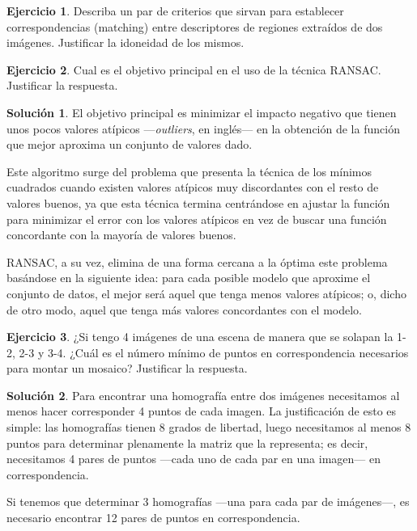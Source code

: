 \documentclass[a4paper, 11pt]{article}
\theoremstyle{definition}
\newtheorem{ejercicio}{Ejercicio}
\newtheorem*{solucion}{Solución}
\theoremstyle{theorem}
\begin{document}
  \begin{ejercicio}
      Describa un par de criterios que sirvan para establecer correspondencias (matching) entre descriptores de regiones extraídos de dos imágenes. Justificar la idoneidad de los mismos.
  \end{ejercicio}

  \begin{ejercicio}
      Cual es el objetivo principal en el uso de la técnica RANSAC. Justificar la respuesta.
  \end{ejercicio}

  \begin{solucion}
      El objetivo principal es minimizar el impacto negativo que tienen unos pocos valores atípicos ---\emph{outliers}, en inglés--- en la obtención de la función que mejor aproxima un conjunto de valores dado.

      Este algoritmo surge del problema que presenta la técnica de los mínimos cuadrados cuando existen valores atípicos muy discordantes con el resto de valores buenos, ya que esta técnica termina centrándose en ajustar la función para minimizar el error con los valores atípicos en vez de buscar una función concordante con la mayoría de valores buenos.

      RANSAC, a su vez, elimina de una forma cercana a la óptima este problema basándose en la siguiente idea: para cada posible modelo que aproxime el conjunto de datos, el mejor será aquel que tenga menos valores atípicos; o, dicho de otro modo, aquel que tenga más valores concordantes con el modelo.
  \end{solucion}

  \begin{ejercicio}
      ¿Si tengo 4 imágenes de una escena de manera que se solapan la 1-2, 2-3 y 3-4. ¿Cuál es el número mínimo de puntos en correspondencia necesarios para montar un mosaico? Justificar la respuesta.
  \end{ejercicio}

  \begin{solucion}
      Para encontrar una homografía entre dos imágenes necesitamos al menos hacer corresponder 4 puntos de cada imagen. La justificación de esto es simple: las homografías tienen 8 grados de libertad, luego necesitamos al menos 8 puntos para determinar plenamente la matriz que la representa; es decir, necesitamos 4 pares de puntos ---cada uno de cada par en una imagen--- en correspondencia.

      Si tenemos que determinar 3 homografías ---una para cada par de imágenes---, es necesario encontrar 12 pares de puntos en correspondencia.
  \end{solucion}
\end{document}
